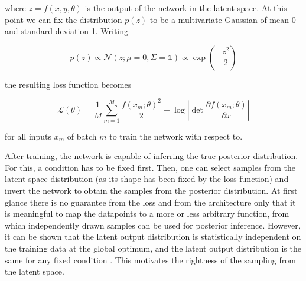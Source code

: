 where $z = f(x, y, \theta)$ is the output of the network in the latent space. At this point we can fix the distribution $p(z)$ to be a multivariate Gaussian of mean 0 and standard deviation 1. Writing

\begin{equation*}
	p(z) \propto \mathcal{N}(z; \mu = 0, \Sigma=\mathbb{1}) \propto \exp\left(-\frac{z^2}{2}\right)
\end{equation*}

the resulting loss function becomes

\begin{equation*}
	\mathcal{L}(\theta) = \frac{1}{M} \sum_{m=1}^{M} \frac{f(x_m; \theta)^2}{2} - \log\left|\det\frac{\partial f(x_m; \theta)}{\partial x}\right|
\end{equation*}

for all inputs $x_m$ of batch $m$ to train the network with respect to.

After training, the network is capable of inferring the true posterior distribution. For this, a condition has to be fixed first. Then, one can select samples from the latent space distribution (as its shape has been fixed by the loss function) and invert the network to obtain the samples from the posterior distribution.
At first glance there is no guarantee from the loss and from the architecture only that it is meaningful to map the datapoints to a more or less arbitrary function, from which independently drawn samples can be used for posterior inference. However, it can be shown that the latent output distribution is statistically independent on the training data at the global optimum, and the latent output distribution is the same for any fixed condition \cite{BayesFlow}. This motivates the rightness of the sampling from the latent space.

